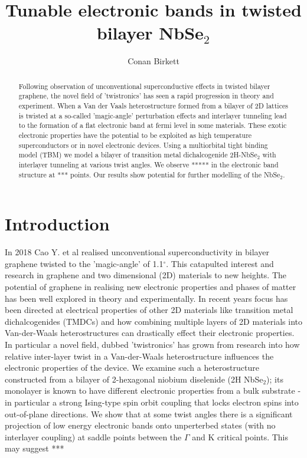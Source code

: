 \documentclass[12pt]{report} %
\title{\textbf{Tunable electronic bands in twisted bilayer NbSe$_2$}}
\author{Conan Birkett}
\affil{Department of Physics, University of Bath, Bath BA2 7AY, United Kingdom}
\begin{document}
\maketitle
\begin{abstract}
  Following observation of unconventional superconductive effects in twisted bilayer graphene, the novel field of 'twistronics' has seen a rapid progression in theory and experiment. When a Van der Vaals heterostructure formed from a bilayer of 2D lattices is twisted at a so-called 'magic-angle' perturbation effects and interlayer tunneling lead to the formation of a flat electronic band at fermi level in some materials. These exotic electronic properties have the potential to be exploited as high temperature superconductors or in novel electronic devices. Using a multiorbital tight binding model (TBM) we model a bilayer of transition metal dichalcogenide 2H-NbSe$_2$ with interlayer tunneling at various twist angles. We observe ***** in the electronic band structure at *** points. Our results show potential for further modelling of the NbSe$_2$.
\end{abstract}

\newpage

\section*{Introduction}

  In 2018 Cao Y. et al\cite{Cao2018} realised unconventional superconductivity in bilayer graphene twisted to the 'magic-angle' of 1.1$^\circ$. This catapulted interest and research in graphene and two dimensional (2D) materials to new heights. The potential of graphene in realising new electronic properties and phases of matter has been well explored in theory and experimentally. In recent years focus has been directed at electrical properties of other 2D materials like transition metal dichalcogenides (TMDCs) and how combining multiple layers  of 2D materials into Van-der-Waals heterostructures can drastically effect their electronic properties. In particular a novel field, dubbed 'twistronics' has grown from research into how relative inter-layer twist in a Van-der-Waals heterostructure influences the electronic properties of the device. We examine such a heterostructure constructed from a bilayer of 2-hexagonal niobium diselenide (2H NbSe$_2$); its monolayer is known to have different electronic properties from a bulk substrate - in particular a strong Ising-type spin orbit coupling that locks electron spins into out-of-plane directions. We show that at some twist angles there is a significant projection of low energy electronic bands onto unperterbed states (with no interlayer coupling) at saddle points between the $\Gamma$ and K critical points. This may suggest ***
\end{document}
